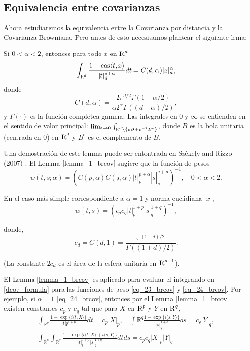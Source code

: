 	\subsection{Equivalencia entre covarianzas}
	
	Ahora estudiaremos la equivalencia entre la Covarianza por distancia y la Covarianza Browniana. Pero antes de esto necesitamos plantear el siguiente lema:

	\begin{lem}\label{lemma_1_brcov}
		Si $0<\alpha<2$, entonces para todo $x$ en $\textsc{R}^d$
		$$
		\int_{\textsc{R}^d} \frac{1-\cos \langle t, x\rangle}{|t|_d^{d+\alpha}} d t=C(d, \alpha)|x|_d^\alpha,
		$$
		donde
		$$
		C(d, \alpha)=\frac{2 \pi^{d / 2} \Gamma(1-\alpha / 2)}{\alpha 2^\alpha \Gamma((d+\alpha) / 2)},
		$$
		y $\Gamma(\cdot)$ es la funci\'on completea gamma. Las integrales en 0 y $\infty$ se entienden en el sentido de valor principal: $\lim_{\varepsilon \rightarrow 0} \int_{\textsc{R}^d \backslash\left\{\varepsilon B+\varepsilon^{-1} B^c\right\}}$, donde $B$ es la bola unitaria (centrada en 0) en $\textsc{R}^d$ y $B^c$ es el complemento de $B$.
	\end{lem}
	Una demostraci\'on de este lemma puede ser entontrada en Székely and Rizzo (2007) \cite{Szekely2007}. El Lemma \ref{lemma_1_brcov}
	sugiere que la funci\'on de pesos
	\begin{equation}\label{eq_23_brcov}
	w(t, s ; \alpha)=\left(\left.\left.C(p, \alpha) C(q, \alpha)|t|_p^{p+\alpha}\right|s\right|_q ^{q+\alpha}\right)^{-1}, \quad 0<\alpha<2 .	
	\end{equation}

	En el caso m\'as simple correspondiente a $\alpha=1$ y norma euclidiana $|x|$,
	\begin{equation}\label{eq_24_brcov}
		w(t, s)=\left(c_p c_q|t|_p^{1+p}|s|_q^{1+q}\right)^{-1},
		\end{equation}
	
	donde,
	\begin{equation}\label{eq_25_brcov}
		c_d=C(d, 1)=\frac{\pi^{(1+d) / 2}}{\Gamma((1+d) / 2)} .
	\end{equation}
	
	(La constante $2 c_d$ es el \'area de la esfera unitaria en $\textsc{R}^{d+1}$).
	\begin{rem}
		El Lemma \ref{lemma_1_brcov} es aplicado para evaluar el integrando en \ref{dcov_formula} para las funciones de peso \ref{eq_23_brcov} y \ref{eq_24_brcov}. Por ejemplo, si $\alpha=1$ \ref{eq_24_brcov}, entonces por el Lemma \ref{lemma_1_brcov} existen constantes $c_p$ y $c_q$ tal que para $X$ en $\textsc{R}^p$ y $Y$ en $\textsc{R}^q$,
		$$
		\begin{gathered}
		\int_{\mathbb{R}^p} \frac{1-\exp \{i\langle t, X\rangle\}}{|t|p^{1+p}} d t=c_p|X|_p, \quad \int{\mathbb{R}^q} \frac{1-\exp \{i\langle s, Y\rangle\}}{|s|_q^{1+q}} d s=c_q|Y|_q, \\
		\int_{\mathbb{R}^p} \int_{\mathbb{R}^q} \frac{1-\exp \{i\langle t, X\rangle+i\langle s, Y\rangle\}}{|t|_p^{1+p}|s|_q^{1+q}} d t d s=c_p c_q|X|_p|Y|_q
		\end{gathered}
		$$
	\end{rem}
	
